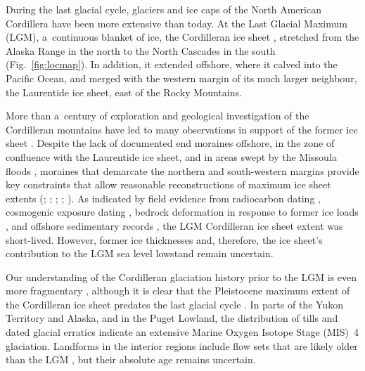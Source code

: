 \documentclass[tc, manuscript]{copernicus}
\begin{document}
\introduction
\label{sec:intro}

      During the last glacial cycle, glaciers and ice caps of the North
      American Cordillera have been more extensive than today. At the Last
      Glacial Maximum (LGM), a~continuous blanket of ice, the Cordilleran
      ice sheet \citep{Dawson.1888}, stretched from the Alaska Range in the
      north to the North Cascades in the south (Fig.~\ref{fig:locmap}). In
      addition, it extended offshore, where it calved into the Pacific
      Ocean, and merged with the western margin of its much larger
      neighbour, the Laurentide ice sheet, east of the Rocky Mountains.

      More than a~century of exploration and geological investigation of the
      Cordilleran mountains have led to many observations in support of the
      former ice sheet \citep{Jackson.Clague.1991}. Despite the lack of
      documented end moraines offshore, in the zone of confluence with the
      Laurentide ice sheet, and in areas swept by the Missoula floods
      \citep{Carrara.etal.1996}, moraines that demarcate the northern and
      south-western margins provide key constraints that allow reasonable
      reconstructions of maximum ice sheet extents
      (\citealp{Prest.etal.1968}; \citealp[Fig. 1.12]{Clague.1989};
      \citealp{Duk-Rodkin.1999}; \citealp{Booth.etal.2003};
      \citealp{Dyke.2004}). As indicated by field evidence from radiocarbon
      dating \citep{Clague.etal.1980, Clague.1985, Clague.1986,
      Porter.Swanson.1998, Menounos.etal.2008}, cosmogenic exposure dating
      \citep{Stroeven.etal.2010, Stroeven.etal.2014, Margold.etal.2014},
      bedrock deformation in response to former ice loads
      \citep{Clague.James.2002, Clague.etal.2005}, and offshore sedimentary
      records \citep{Cosma.etal.2008, Davies.etal.2011}, the LGM Cordilleran
      ice sheet extent was short-lived. However, former ice thicknesses and,
      therefore, the ice sheet's contribution to the LGM sea level lowstand
      \citep{Carlson.Clark.2012, Clark.Mix.2002} remain uncertain.

      Our understanding of the Cordilleran glaciation history prior to the
      LGM is even more fragmentary \citep{Barendregt.Irving.1998,
      Kleman.etal.2010, Rutter.etal.2012}, although it is clear that the
      Pleistocene maximum extent of the Cordilleran ice sheet predates the
      last glacial cycle \citep{Hidy.etal.2013}. In parts of the Yukon
      Territory and Alaska, and in the Puget Lowland, the distribution of
      tills \citep{Turner.etal.2013, Troost.2014} and dated glacial erratics
      \citep{Ward.etal.2007, Ward.etal.2008, Briner.Kaufman.2008,
      Stroeven.etal.2010, Stroeven.etal.2014} indicate an extensive Marine
      Oxygen Isotope Stage (MIS)~4 glaciation. Landforms in the interior
      regions include flow sets that are likely older than the LGM
      \citep[Fig.~2]{Kleman.etal.2010}, but their absolute age remains
      uncertain.
\end{document}
